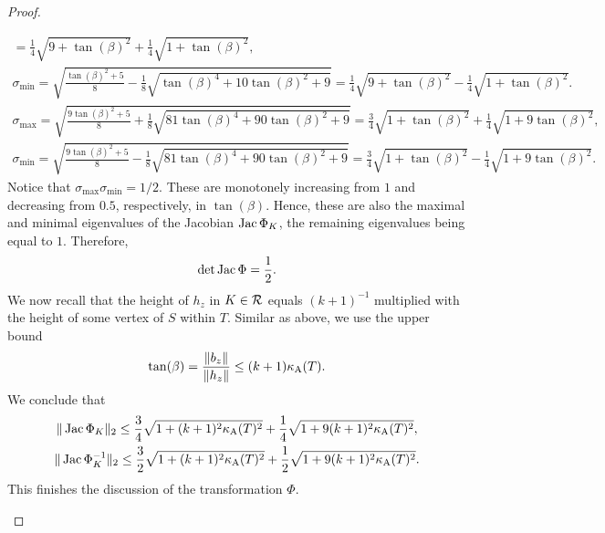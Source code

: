 \documentclass[10pt,a4paper]{article}
\begin{document}
\begin{proof}
\begin{itemize}
\begin{align*}
            =
            \frac 1 4 \sqrt{ 9 + \tan(\beta)^2 } + \frac 1 4 \sqrt{ 1 + \tan(\beta)^2 }
            ,
            \\
            \sigma_{\min} 
            = 
            \sqrt{ \frac{ \tan(\beta)^{2} + 5 }{8} - \frac 1 8 \sqrt{ \tan(\beta)^{4} + 10 \tan(\beta)^{2} + 9 } }
            =
            \frac 1 4 \sqrt{ 9 + \tan(\beta)^2 } - \frac 1 4 \sqrt{ 1 + \tan(\beta)^2 }
            .
        \end{align*}
        \begin{align*}
            \sigma_{\max} 
            = 
            \sqrt{ \frac{ 9\tan(\beta)^{2} + 5 }{8} + \frac 1 8 \sqrt{ 81\tan(\beta)^{4} + 90 \tan(\beta)^{2} + 9 } }
            =
            \frac 3 4 \sqrt{ 1 + \tan(\beta)^2 } + \frac 1 4 \sqrt{ 1 + 9\tan(\beta)^2 }
            ,
            \\
            \sigma_{\min} 
            = 
            \sqrt{ \frac{ 9\tan(\beta)^{2} + 5 }{8} - \frac 1 8 \sqrt{ 81\tan(\beta)^{4} + 90 \tan(\beta)^{2} + 9 } }
            =
            \frac 3 4 \sqrt{ 1 + \tan(\beta)^2 } - \frac 1 4 \sqrt{ 1 + 9\tan(\beta)^2 }
            .
        \end{align*}
        Notice that $\sigma_{\max} \sigma_{\min} = 1/2$. 
        These are monotonely increasing from $1$ and decreasing from $0.5$, respectively, in $\tan(\beta)$. 
        Hence, these are also the maximal and minimal eigenvalues of the Jacobian $\operatorname{{\rm Jac}} \Phi_{K}$, the remaining eigenvalues being equal to $1$. Therefore,
        \begin{align*}
            \det \operatorname{{\rm Jac}}\Phi = \frac 1 2.
        \end{align*}
        We now recall that the height of $h_{z}$ in $K \in {\mathcal R}$ equals $(k+1)^{-1}$ multiplied with the height of some vertex of $S$ within $T$.
        Similar as above, we use the upper bound 
        \begin{align*}
            \tan(\beta) = \frac{\|  b_{z}  \|}{\|  h_{z}  \|} \leq (k+1) \kappa_{\rm A}(T).
        \end{align*}
        We conclude that 
        \begin{gather*}
            \|  \operatorname{{\rm Jac}}\Phi_{K}  \|_{2} 
            \leq 
            \frac 3 4 \sqrt{ 1 + (k+1)^2 \kappa_{\rm A}(T)^2 } + \frac 1 4 \sqrt{ 1 + 9(k+1)^2 \kappa_{\rm A}(T)^2 }
            ,
            \\
            \|  \operatorname{{\rm Jac}}\Phi_{K}^{-1}  \|_{2} 
            \leq 
            \frac 3 2 \sqrt{ 1 + (k+1)^2 \kappa_{\rm A}(T)^2 } + \frac 1 2 \sqrt{ 1 + 9(k+1)^2 \kappa_{\rm A}(T)^2 }
            .
        \end{gather*}
        This finishes the discussion of the transformation $\Phi$.
        

\end{itemize}
\end{proof}
\end{document}

